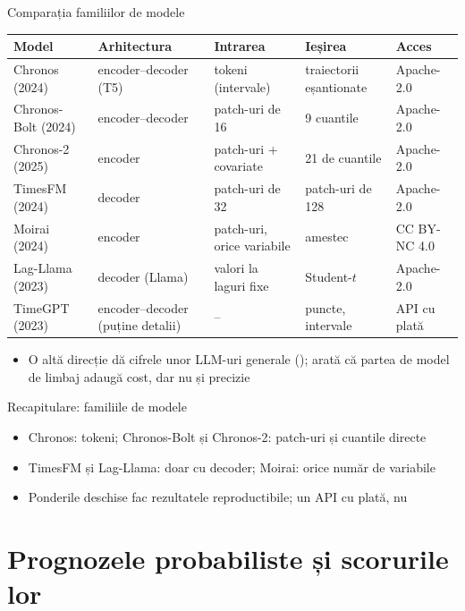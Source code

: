 \begin{frame}{Comparația familiilor de modele}
\itemsize{\footnotesize}
\begin{center}
\scriptsize
\begin{tabular}{lllll}
\toprule
\textbf{Model} & \textbf{Arhitectura} & \textbf{Intrarea} & \textbf{Ieșirea} & \textbf{Acces} \\
\midrule
Chronos (2024) & encoder--decoder (T5) & tokeni (intervale) & traiectorii eșantionate & Apache-2.0 \\
Chronos-Bolt (2024) & encoder--decoder & patch-uri de 16 & 9 cuantile & Apache-2.0 \\
Chronos-2 (2025) & encoder & patch-uri + covariate & 21 de cuantile & Apache-2.0 \\
TimesFM (2024) & decoder & patch-uri de 32 & patch-uri de 128 & Apache-2.0 \\
Moirai (2024) & encoder & patch-uri, orice variabile & amestec & CC BY-NC 4.0 \\
Lag-Llama (2023) & decoder (Llama) & valori la laguri fixe & Student-$t$ & Apache-2.0 \\
TimeGPT (2023) & encoder--decoder (puține detalii) & -- & puncte, intervale & API cu plată \\
\bottomrule
\end{tabular}
\end{center}
\begin{itemize}
    \item O altă direcție dă cifrele unor LLM-uri generale ();  arată că partea de model de limbaj adaugă cost, dar nu și precizie
\end{itemize}
\end{frame}

\begin{frame}{Recapitulare: familiile de modele}
\itemsize{\small}
\begin{itemize}
    \item Chronos: tokeni; Chronos-Bolt și Chronos-2: patch-uri și cuantile directe
    \item TimesFM și Lag-Llama: doar cu decoder; Moirai: orice număr de variabile
    \item Ponderile deschise fac rezultatele reproductibile; un API cu plată, nu
\end{itemize}
\end{frame}


\section{Prognozele probabiliste și scorurile lor}

